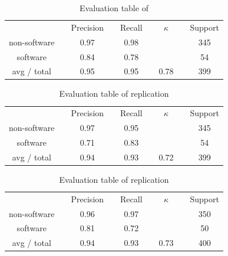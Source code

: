 \documentclass[12pt, a4paper]{scrartcl}
\newcommand{\ra}[1]{\renewcommand{\arraystretch}{#1}}
\theoremstyle{definition}
\begin{document}
\begin{table}[!hp]\caption{Evaluation table of \cite{bessen2007empirical}}\label{tab:eval_algo_original}\centering\ra{1.3}
\begin{tabular}{@{}cp{0.5cm}cp{0.5cm}cp{0.5cm}cp{0.5cm}c@{}} \toprule
 & & Precision & & Recall & & $\kappa$ & & Support\\ \cline{1-1} \cline{3-3} \cline{5-5} \cline{7-7} \cline{9-9}
non-software & & 0.97 & & 0.98 & &  & & 345\\
software & & 0.84 & & 0.78 & &  & & 54\\ \cline{1-1} \cline{3-3} \cline{5-5} \cline{7-7} \cline{9-9}
avg / total & & 0.95 & & 0.95 & & 0.78 & & 399\\
\bottomrule
\end{tabular}
\end{table}

\begin{table}[!hp]\caption{Evaluation table of replication}\label{tab:eval_algo_rep}\centering\ra{1.3}
\begin{tabular}{@{}cp{0.5cm}cp{0.5cm}cp{0.5cm}cp{0.5cm}c@{}} \toprule
 & & Precision & & Recall & & $\kappa$ & & Support\\ \cline{1-1} \cline{3-3} \cline{5-5} \cline{7-7} \cline{9-9}
non-software & & 0.97 & & 0.95 & &  & & 345\\
software & & 0.71 & & 0.83 & &  & & 54\\ \cline{1-1} \cline{3-3} \cline{5-5} \cline{7-7} \cline{9-9}
avg / total & & 0.94 & & 0.93 & & 0.72 & & 399\\
\bottomrule
\end{tabular}
\end{table}

\newpage

\begin{table}[!hp]\caption{Evaluation table of replication}\label{tab:eval_machine_learning}\centering\ra{1.3}
\begin{tabular}{@{}cp{0.5cm}cp{0.5cm}cp{0.5cm}cp{0.5cm}c@{}} \toprule
 & & Precision & & Recall & & $\kappa$ & & Support\\ \cline{1-1} \cline{3-3} \cline{5-5} \cline{7-7} \cline{9-9}
non-software & & 0.96 & & 0.97 & &  & & 350\\
software & & 0.81 & & 0.72 & &  & & 50\\ \cline{1-1} \cline{3-3} \cline{5-5} \cline{7-7} \cline{9-9}
avg / total & & 0.94 & & 0.93 & & 0.73 & & 400\\
\bottomrule
\end{tabular}
\end{table}
\end{document}
